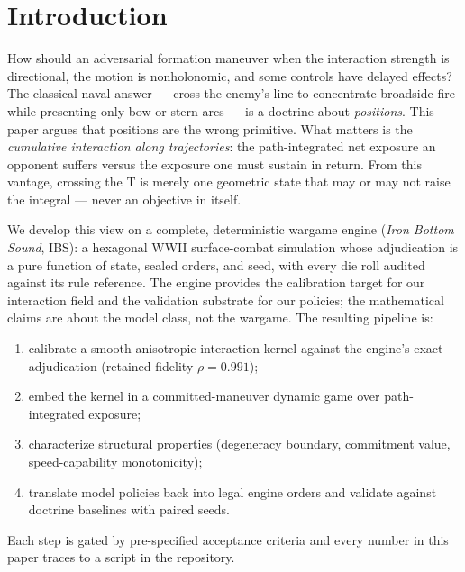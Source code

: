 \documentclass[12pt,a4paper]{article}
\begin{document}
\section{Introduction}\label{sec:intro}

How should an adversarial formation maneuver when the interaction strength
is directional, the motion is nonholonomic, and some controls have delayed
effects?  The classical naval answer --- cross the enemy's line to concentrate
broadside fire while presenting only bow or stern arcs --- is a doctrine about
\emph{positions}.  This paper argues that positions are the wrong primitive.
What matters is the \emph{cumulative interaction along trajectories}: the
path-integrated net exposure an opponent suffers versus the exposure one must
sustain in return.  From this vantage, crossing the T is merely one geometric
state that may or may not raise the integral --- never an objective in itself.

We develop this view on a complete, deterministic wargame engine
(\emph{Iron Bottom Sound}, IBS): a hexagonal WWII surface-combat simulation
whose adjudication is a pure function of state, sealed orders, and seed, with
every die roll audited against its rule reference.  The engine provides the
calibration target for our interaction field and the validation substrate for
our policies; the mathematical claims are about the model class, not the
wargame.  The resulting pipeline is:
\begin{enumerate}
\item calibrate a smooth anisotropic interaction kernel against the engine's
exact adjudication (retained fidelity $\rho=0.991$);
\item embed the kernel in a committed-maneuver dynamic game over
path-integrated exposure;
\item characterize structural properties (degeneracy boundary, commitment
value, speed-capability monotonicity);
\item translate model policies back into legal engine orders and validate
against doctrine baselines with paired seeds.
\end{enumerate}
Each step is gated by pre-specified acceptance criteria and every number in
this paper traces to a script in the repository.
\end{document}
